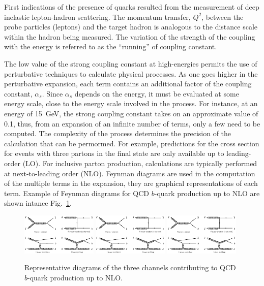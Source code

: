 First indications of the presence of quarks resulted from the measurement of deep inelastic lepton-hadron scattering. The momentum transfer, $Q^2$, between the probe particles (leptons) and the target hadron is analogous to the distance scale within the hadron being measured. The variation of the strength of the coupling with the energy is referred to as the ``running'' of coupling constant.


The low value of the strong coupling constant at high-energies permits the use of perturbative techniques to calculate physical processes. As one goes higher in the perturbative expansion, each term contains an additional factor of the coupling constant, $\alpha_s$.  Since  $\alpha_s$ depends on the energy, it must be evaluated at some energy scale, close to the energy scale involved in the process.  For instance, at an energy of 15~GeV, the strong coupling constant takes on an approximate value of 0.1, thus, from an expansion of an infinite number of terms, only a few need to be computed.  The complexity of the process determines the precision of the calculation that can be permormed.  For example, predictions for the cross section for events with three partons in the final state are only available up to leading-order (LO).  For inclusive parton production, calculations are typically performed at next-to-leading order (NLO).  Feynman diagrams are used in the computation of the multiple terms in the expansion, they are graphical representations of each term. Example of Feynman diagrams for QCD $b$-quark production up to NLO are shown intance Fig.~\ref{fig:qcd_diagrams}.

\begin{figure}[h!]
\centering
\includegraphics[width=0.32\textwidth,viewport=0 880 1500 1600,clip]{FIGS/bb_diagrams.jpg}
\includegraphics[width=0.32\textwidth,viewport=1600 0 3100 820,clip]{FIGS/bb_diagrams.jpg}
\includegraphics[width=0.32\textwidth,viewport=0 0 1500 820,clip]{FIGS/bb_diagrams.jpg}
\caption{Representative diagrams of the three channels contributing to QCD $b$-quark production up to NLO.} %
\label{fig:qcd_diagrams}
\end{figure}


